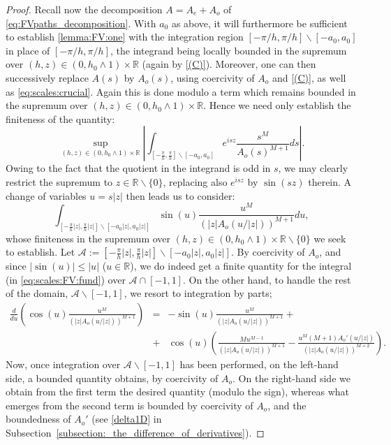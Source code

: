 \documentclass[pdftex,oneside,11pt,reqno]{amsart}
\theoremstyle{definition}
\theoremstyle{theorem}
\theoremstyle{remark}
\numberwithin{equation}{section}
\numberwithin{definition}{section}
\begin{document}
\begin{proof}
Recall now the decomposition $A=A_e+A_o$ of \eqref{eq:FVpaths_decomposition}. With $a_0$ as above, it will furthermore be sufficient to establish \eqref{lemma:FV:one} with the integration region $[-\pi/h,\pi/h]\backslash [-a_0,a_0]$ in place of $[-\pi/h,\pi/h]$, the integrand being locally bounded in the supremum over $(h,z)\in (0,h_0\land 1)\times \mathbb{R}$ (again by \ref{(C)}). Moreover, one can then successively replace $A(s)$ by $A_o(s)$, using coercivity of $A_o$ and \ref{(C)}, as well as \eqref{eq:scales:crucial}. Again this is done modulo a term which remains bounded in the supremum over $(h,z)\in (0,h_0\land 1)\times \mathbb{R}$. Hence we need only establish the finiteness of the quantity: $$\sup_{(h,z)\in (0,h_0\land 1)\times \mathbb{R}}\left\vert \int_{[-\frac{\pi}{h},\frac{\pi}{h}]\backslash [-a_0,a_0]}e^{isz}\frac{s^{M}}{A_o(s)^{M+1}}ds\right\vert.$$ Owing to the fact that the quotient in the integrand is odd in $s$, we may clearly restrict the supremum to $z\in \mathbb{R}\backslash \{0\}$, replacing also $e^{isz}$ by $\sin(sz)$ therein. A change of variables $u=s\vert z\vert$ then leads us to consider: 
\begin{equation}\label{eq:scales:FV:fund}
\int_{[-\frac{\pi}{h}\vert z\vert,\frac{\pi}{h}\vert z\vert]\backslash [-a_0\vert z\vert,a_0\vert z\vert]}\sin(u)\frac{u^M}{(\vert z \vert A_o(u/\vert z\vert))^{M+1}}du,
\end{equation}
whose finiteness in the supremum over $(h,z)\in (0,h_0\land 1)\times \mathbb{R}\backslash \{0\}$ we seek to establish. Let $\mathcal{A}:=[-\frac{\pi}{h}\vert z\vert,\frac{\pi}{h}\vert z\vert]\backslash [-a_0\vert z\vert,a_0\vert z\vert]$. By coercivity of $A_o$, and since $\vert \sin(u) \vert\leq \vert u\vert$ ($u\in  \mathbb{R}$), we do indeed get a finite quantity for the integral (in \eqref{eq:scales:FV:fund}) over $\mathcal{A}\cap [-1,1]$. On the other hand, to handle the rest of the domain, $\mathcal{A}\backslash [-1,1]$, we resort to integration by parts; 
\begin{eqnarray*}
\frac{d}{du}\left(\cos(u)\frac{u^M}{(\vert z \vert A_o(u/\vert z\vert))^{M+1}}\right)&=&-\sin(u)\frac{u^M}{(\vert z \vert A_o(u/\vert z\vert))^{M+1}}+\\
&+&\cos(u)\left(\frac{Mu^{M-1}}{(\vert z \vert A_o(u/\vert z\vert))^{M+1}}-\frac{u^M(M+1)A_o'(u/\vert z\vert)}{(\vert z\vert A_o(u/ \vert z\vert))^{M+2}}\right).
\end{eqnarray*} 
Now, once integration over $\mathcal{A}\backslash [-1,1]$ has been performed, on the left-hand side, a bounded quantity obtains, by coercivity of $A_o$. On the right-hand side we obtain from the first term the desired quantity (modulo the sign), whereas what emerges from the second term is bounded by coercivity of $A_o$, and the boundedness of $A_o'$ (see \ref{delta1D} in Subsection~\ref{subsection:_the_difference_of_derivatives}). 


\end{proof}
\end{document}
